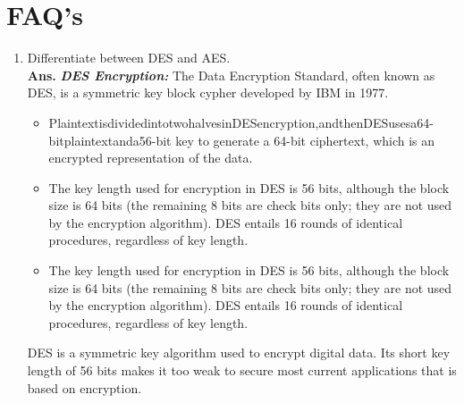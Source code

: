 \documentclass{article}
\begin{document}
\section{\textbf{FAQ's}}
\begin{enumerate}
	\item Differentiate between DES and AES.\\
	
	\textbf{Ans.}  \textbf{\textit{DES Encryption:}} The Data Encryption Standard, often known as DES, is a symmetric key block cypher developed by IBM in 1977.
	\begin{itemize}
		\item PlaintextisdividedintotwohalvesinDESencryption,andthenDESusesa64-bitplaintextanda56-bit key to generate a 64-bit ciphertext, which is an encrypted representation of the data.
		\item The key length used for encryption in DES is 56 bits, although the block size is 64 bits (the remaining 8 bits are check bits only; they are not used by the encryption algorithm). DES entails 16 rounds of identical procedures, regardless of key length.
		\item The key length used for encryption in DES is 56 bits, although the block size is 64 bits (the remaining 8 bits are check bits only; they are not used by the encryption algorithm). DES entails 16 rounds of identical procedures, regardless of key length.
	\end{itemize} 
	DES is a symmetric key algorithm used to encrypt digital data. Its short key length of 56 bits makes it too weak to secure most current applications that is based on encryption.\\
	

\end{enumerate}
\end{document}
